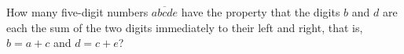 How many five-digit numbers $\overline{abcde}$ have the property that the digits $b$ and $d$ are each the sum of the two digits immediately to their left and right, that is, $b=a+c$ and $d=c+e$?
